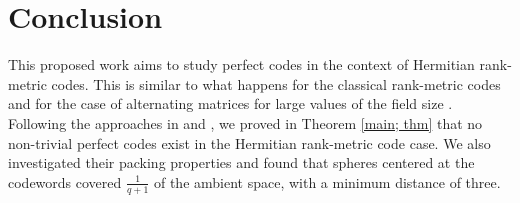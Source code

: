 \documentclass[12pt,a4paper]{article}
\begin{document}
 \section{Conclusion}\label{sec : 5}
This proposed work aims to study perfect codes in the context of Hermitian rank-metric codes. This is similar to what happens for the classical rank-metric codes \cite{loidreau2006properties} and for the case of alternating matrices for large values of the field size \cite{abiad2024eigenvalue}. Following the approaches in \cite{loidreau2006properties} and \cite{mushrraf2024perfect}, we proved in Theorem \ref{main; thm} that no non-trivial perfect codes exist in the Hermitian rank-metric code case. We also investigated their packing properties and found that spheres centered at the codewords covered $\frac{1}{q+1}$ of the ambient space, with a minimum distance of three.

%
\end{document}
